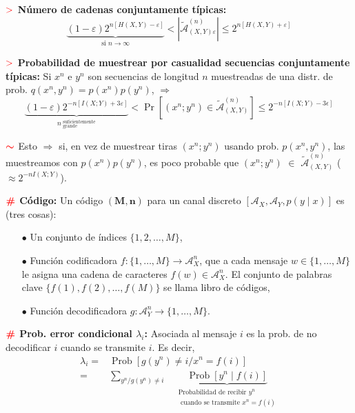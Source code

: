 \documentclass[%
 reprint,
 amsmath,amssymb,
 aps,
]{revtex4-1}
\begin{document}
\textbf{$\textcolor{red}{\mathbf{>}}$ Número de cadenas conjuntamente típicas:}
$$
\underbrace{(1-\varepsilon) 2^{n[H(X, Y)-\varepsilon]}}_{\text{si } n \rightarrow \infty } <
\left|\tilde{\mathcal{A}}_{(X, Y) \varepsilon}^{(n)}\right| \leq 2^{n[H(X, Y)+\varepsilon]}$$

\textbf{$\textcolor{red}{\mathbf{>}}$ Probabilidad de muestrear por casualidad secuencias conjuntamente típicas:}
Si $x^{n}$ e $y^{n}$ son secuencias de longitud $n$ muestreadas de una distr. de prob. ${q\left(x^{n}, y^{n}\right)}=p\left(x^{n}\right) p\left(y^{n}\right)$, $\Rightarrow$
$$
\underbrace{(1-\varepsilon) 2^{-n[I(X ; Y)+3 \varepsilon]}}_{n \ ^\text{suficientemente} _\text{grande}}
<
\operatorname{Pr}\left[\left(x^{n} ; y^{n}\right) \in \tilde{\mathcal{A}}_{(X, Y)}^{(n)}\right] \leq 2^{-n[I(X ; Y)-3 \epsilon]}
$$

\textbf{$\textcolor{red}{\color{red}{\boldsymbol{\sim}}}$} 
Esto $\Rightarrow$ si, en vez de muestrear tiras $(x^{n};y^{n})$ usando prob. $p\left(x^{n}, y^{n}\right)$, las muestreamos con $p\left(x^{n}\right)p\left(y^{n}\right)$, es poco probable que $\left(x^{n}; y^{n}\right)$ $\in$ $\tilde{\mathcal{A}}_{(X, Y)}^{(n)}$ ($\approx 2^{-n I(X ; Y)}$).

\textbf{$\color{red}{\textbf{\#}}$ Código:} 
Un código $(\boldsymbol{M}, \boldsymbol{n})$ para un canal discreto $\left[\mathcal{A}_{X}, \mathcal{A}_{Y}, p(y \mid x)\right]$ es (tres cosas):
\begin{enumerate} 
  \item[$\bullet$] Un conjunto de índices $\{1,2, \ldots, M\}$,
  \item[$\bullet$] Función codificadora $f:\{1, \ldots, M\} \rightarrow \mathcal{A}_{X}^{n}$, que a cada mensaje $w \in\{1, \ldots, M\}$ le asigna una cadena de caracteres $f(w) \in \mathcal{A}_{X}^{n} .$ El conjunto de palabras clave $\{f(1), f(2), \ldots, f(M)\}$ se llama libro de códigos,
  \item[$\bullet$] Función decodificadora $g: \mathcal{A}_{Y}^{n} \rightarrow\{1, \ldots, M\}$.
\end{enumerate}

\textbf{$\color{red}{\textbf{\#}}$ Prob. error condicional $\lambda_{i}$:} 
Asociada al mensaje $i$ es la prob. de no decodificar $i$ cuando se transmite $i$. Es decir,
$$
\begin{aligned}
\lambda_{i}=& \operatorname{Prob}\left[g\left(y^{n}\right) \neq i / x^{n}=f(i)\right] \\
=& \sum_{y^{n} / g\left(y^{n}\right) \neq i} \quad \underbrace{
  \operatorname{Prob}\left[y^{n} \mid f(i)\right]}_{
    \substack{
    \text {Probabilidad de recibir } y^{n} \\ \text { cuando se transmite } x^{n}=f(i)
    }
  }
\end{aligned}
$$
\end{document}
